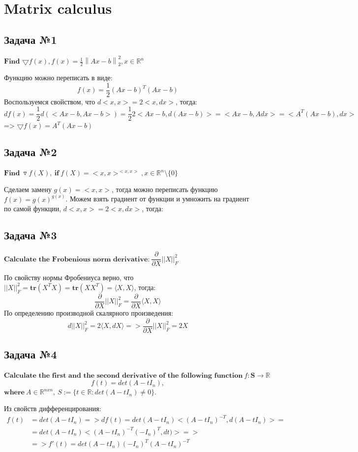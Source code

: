 \documentclass[12pt,letterpaper]{article}
\begin{document}
\section{Matrix calculus}
\subsection*{Задача №1}
$\textbf{Find}$ $\bigtriangledown f(x), f(x)= \frac{1}{2} {\left \| Ax-b \right \|}^2_2 , x \in \mathbb{R}^n$

Функцию можно переписать в виде:
$$ f(x)=\frac{1}{2}(Ax-b)^T(Ax-b)$$
Воспользуемся свойством, что $d<x,x>=2<x,dx>$, тогда:
$$ df(x)=\frac{1}{2}d(<Ax-b,Ax-b>)=\frac{1}{2}2<Ax-b,d(Ax-b)>=<Ax-b,Adx>=<A^T(Ax-b),dx>$$
=> $\bigtriangledown f(x)= A^T(Ax-b)$

\subsection*{Задача №2}
$\textbf{Find}\ \triangledown f(X),\ \textbf{if}\ f(X)=<x,x>^{<x,x>}, x\in \mathbb{R}^n\setminus\{0\} $

Сделаем замену $g(x)=<x,x>$, тогда можно переписать функцию $f(x)=g(x)^{g(x)}$. Можем взять градиент от функции и умножить на градиент по самой функции, $d<x,x>=2<x,dx>$, тогда:


\subsection*{Задача №3}
$\textbf{Calculate the Frobenious norm derivative:}\ \dfrac{\partial}{\partial X}||X||_F^2$

По свойству нормы Фробениуса верно, что $ ||X||_F^2 =  \mathbf{tr} \left( X^T X \right) = \mathbf{tr} \left(X X^T \right) = \langle X, X \rangle $, тогда: 
$$
\dfrac{\partial}{\partial X}||X||_F^2 = \dfrac{\partial}{\partial X} \langle X, X \rangle 
$$
По определению производной скалярного произведения:
$$
d ||X||_F^2 = 2 \langle X, d X \rangle =>  \dfrac{\partial}{\partial X}||X||_F^2 = 2 X 
$$

\subsection*{Задача №4}
$\textbf{Calculate the first and the second derivative of the following function}\ f: \textbf{S}\rightarrow\mathbb{R}$
$$f(t)=det(A-tI_n),$$
$\textbf{where}\ A\in\mathbb{R}^{nxn},\ S:=\{t\in\mathbb{R}:det(A-tI_n)\neq0\}. $

Из свойств дифференцирования:
$$
\begin{aligned}
f(t)&=det(A-tI_n)=>df(t)=det(A-tI_n)<(A-tI_n)^{-T},d(A-tI_n)> =\\&=det(A-tI_n)<(A-tI_n)^{-T}(-I_n)^{T},dt)> => \\ &=>f'(t)=det(A-tI_n)(-I_n)^{T}(A-tI_n)^{-T}
\end{aligned}
$$
\end{document}
